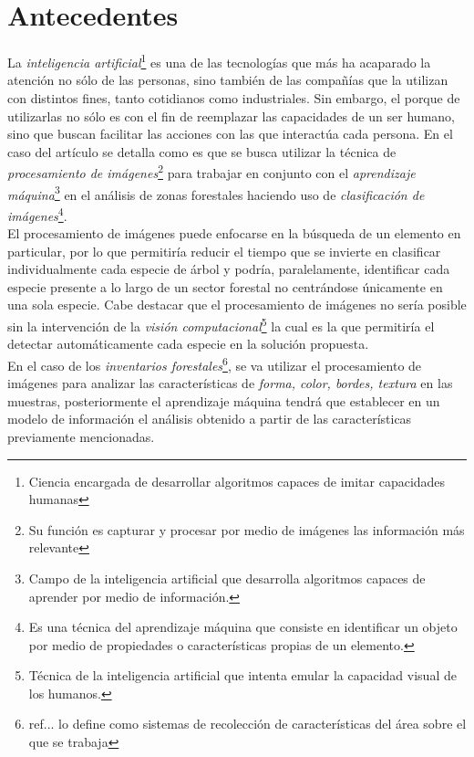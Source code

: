\documentclass[review]{elsarticle}
\begin{document}
\section{Antecedentes}
La \emph{inteligencia artificial}\footnote{Ciencia encargada de desarrollar algoritmos capaces de imitar capacidades humanas} es una de las tecnologías que más ha acaparado la atención no sólo de las personas, sino también de las compañías que la utilizan con distintos fines, tanto cotidianos como industriales. Sin embargo, el porque de utilizarlas no sólo es con el fin de reemplazar las capacidades de un ser humano, sino que buscan facilitar las acciones con las que interactúa cada persona. En el caso del artículo se detalla como es que se busca utilizar la técnica de  \emph{procesamiento de imágenes}\footnote{Su función es capturar y procesar por medio de imágenes las información más relevante} para trabajar en conjunto con el \emph{aprendizaje máquina}\footnote{Campo de la inteligencia artificial que desarrolla algoritmos capaces de aprender por medio de información.} en el análisis de zonas forestales haciendo uso de \emph{clasificación de imágenes}\footnote{Es una técnica del aprendizaje máquina que consiste en identificar un objeto por medio de propiedades o características propias de un elemento.}.\\

El procesamiento de imágenes puede enfocarse en la búsqueda de un elemento en particular, por lo que permitiría reducir el tiempo que se invierte en clasificar individualmente cada especie de árbol y podría, paralelamente, identificar cada especie presente  a lo largo de un sector forestal no centrándose únicamente en una sola especie. Cabe destacar que el procesamiento de imágenes no sería posible sin la intervención de la \emph{visión computacional}\footnote{Técnica de la inteligencia artificial que intenta emular la capacidad visual de los humanos.} la cual es la que permitiría el detectar automáticamente cada especie en la solución propuesta.\\

En el caso de los \emph{inventarios forestales}\footnote{ref... lo define como sistemas de recolección de características del área sobre el que se trabaja}, se va utilizar el procesamiento de imágenes para analizar las características de \textit{forma, color, bordes, textura} en las muestras, posteriormente el aprendizaje máquina tendrá que establecer en un modelo de información el análisis obtenido a partir de las características previamente mencionadas.
\end{document}
